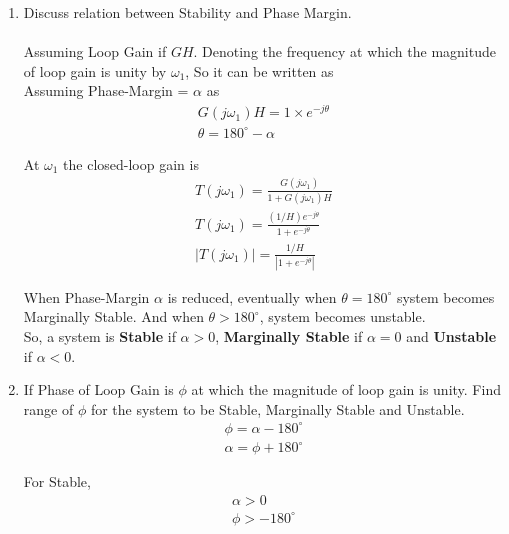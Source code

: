 \begin{enumerate}[label=\thesection.\arabic*.,ref=\thesection.\theenumi]
\item Discuss relation between Stability and Phase Margin.\\
\solution\\
Assuming Loop Gain if $GH$. Denoting the frequency at which the magnitude of loop gain is unity by $\omega_{1}$, So it can be written as\\

Assuming Phase-Margin = $\alpha$ as
\begin{align}
G(j\omega_{1})H = 1\times e^{-j\theta} \\
\theta = 180^{\circ} - \alpha
\end{align}

At $\omega_{1}$ the closed-loop gain is
\begin{align}
T(j\omega_{1}) = \frac{G(j\omega_{1})}{1+G(j\omega_{1})H}\\
T(j\omega_{1}) = \frac{(1/H) e^{-j \theta}}{1+e^{-j \theta}}\\
|T(j\omega_{1})| = \frac{1/H}{|1+e^{-j \theta}|}
\end{align}

When Phase-Margin $\alpha$ is reduced, eventually when $\theta=180^{\circ}$ system becomes Marginally Stable. And when $\theta > 180^{\circ}$, system becomes unstable.\\
So, a system is \textbf{Stable} if $\alpha > 0$, \textbf{Marginally Stable} if $\alpha = 0$ and \textbf{Unstable} if $\alpha < 0$.\\
\item If Phase of Loop Gain is $\phi$ at which the magnitude of loop gain is unity. Find range of $\phi$ for the system to be Stable, Marginally Stable and Unstable.\\
\solution
\begin{align}
\phi = \alpha - 180^{\circ}\\
\alpha = \phi + 180^{\circ}
\end{align}

For Stable,
\begin{align}
\alpha > 0\\
\phi > -180^{\circ}
\end{align}


\end{enumerate}
